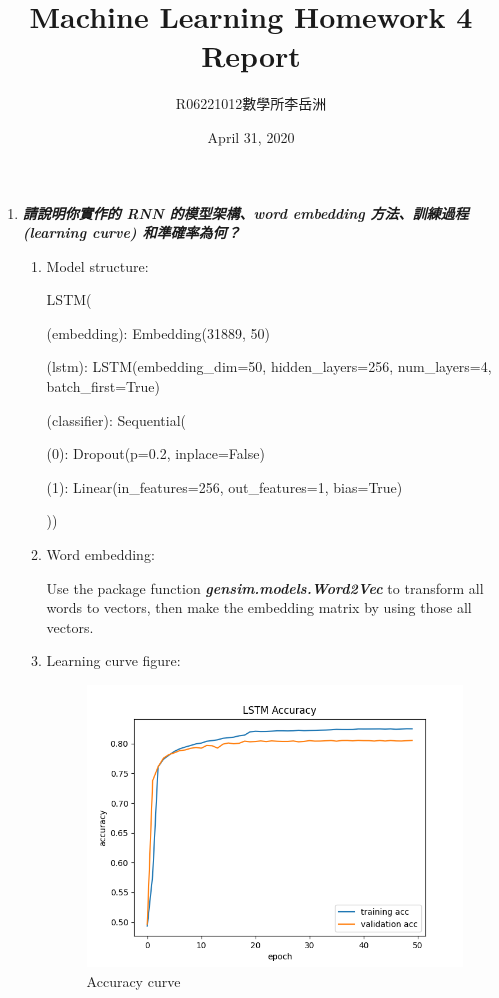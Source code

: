 \documentclass[a4paper,11pt]{article}
\title{Machine Learning Homework 4 Report}
\author{R06221012\hspace{0.2cm}數學所\hspace{0.2cm}李岳洲}
\date{April 31, 2020}
\begin{document}
\maketitle

\begin{enumerate}
	\item \textit{\textbf{請說明你實作的 RNN 的模型架構、word embedding 方法、訓練過程 (learning curve) 和準確率為何？}}

	\begin{enumerate}

		\item Model structure:

			LSTM(

			\quad (embedding): Embedding(31889, 50)

			\quad (lstm): LSTM(embedding\_dim=50, hidden\_layers=256, num\_layers=4, batch\_first=True)

			\quad (classifier): Sequential(

			\quad \quad (0): Dropout(p=0.2, inplace=False)

			\quad \quad (1): Linear(in\_features=256, out\_features=1, bias=True)

			))\\

		\item Word embedding:

			Use the package function \textbf{\textit{gensim.models.Word2Vec}} to transform all words to vectors, then make the embedding matrix by using those all vectors.\\

\newpage

		\item Learning curve figure:\\

		\begin{figure}[htp]
		    \begin{center}
		    		\includegraphics[scale=0.75]{./LSTM_acc.png}
		    	\caption{Accuracy curve}
		    \end{center}
		\end{figure}
	\end{enumerate}


\end{enumerate}
\end{document}
